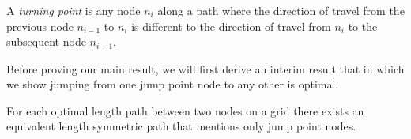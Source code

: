 \begin{definition}
\label{def:turningpoint}
A \emph{turning point} is any node $n_{i}$ along a path where the direction of
travel from the previous node $n_{i-1}$ to $n_{i}$ is different to the direction
of travel from $n_{i}$ to the subsequent node $n_{i+1}$.
\end{definition}

Before proving our main result, we will first derive an interim result that
in which we show jumping from one jump point node to any other is optimal.

\begin{theorem}
\label{theorem:jumping}
For each optimal length path between two nodes on a grid there exists
an equivalent length symmetric path that mentions only jump point nodes.
\end{theorem}
